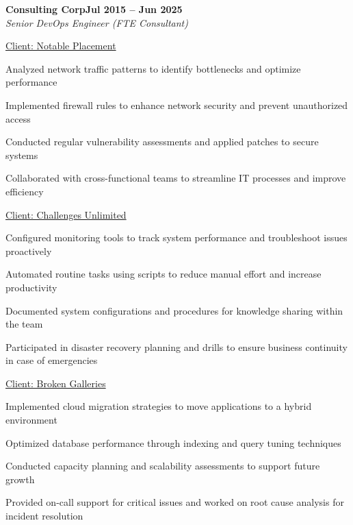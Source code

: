 \documentclass[letterpaper,10pt]{article}
\newcommand{\heading}[2]{
  \hspace{10pt}#1\hfill#2\\
}
\newcommand{\headingBf}[2]{
  \heading{\textbf{#1}}{\textbf{#2}}
}
\newcommand{\headingIt}[2]{
  \heading{\textit{#1}}{\textit{#2}}
}
\newenvironment{resume_list}{
  \vspace{-5pt}
  \begin{itemize}[itemsep=0px, parsep=2pt, leftmargin=30pt]
}{
  \end{itemize}
  \vspace{-2pt}
}
\newcommand{\itemTitle}[1]{
  \item[] \underline{#1}\vspace{5pt}
}
\begin{document}
  \headingBf{Consulting Corp}{Jul 2015 -- Jun 2025}
  \headingIt{Senior DevOps Engineer (FTE Consultant)}{}
  \begin{resume_list}
    \itemTitle{Client: Notable Placement}
    \item Analyzed network traffic patterns to identify bottlenecks and optimize performance
    \item Implemented firewall rules to enhance network security and prevent unauthorized access
    \item Conducted regular vulnerability assessments and applied patches to secure systems
    \item Collaborated with cross-functional teams to streamline IT processes and improve efficiency
    \vspace{3pt}
    \itemTitle{Client: Challenges Unlimited}
    \item Configured monitoring tools to track system performance and troubleshoot issues proactively
    \item Automated routine tasks using scripts to reduce manual effort and increase productivity
    \item Documented system configurations and procedures for knowledge sharing within the team
    \item Participated in disaster recovery planning and drills to ensure business continuity in case of emergencies
    \vspace{3pt}
    \itemTitle{Client: Broken Galleries}
    \item Implemented cloud migration strategies to move applications to a hybrid environment
    \item Optimized database performance through indexing and query tuning techniques
    \item Conducted capacity planning and scalability assessments to support future growth
    \item Provided on-call support for critical issues and worked on root cause analysis for incident resolution
  \end{resume_list}
\end{document}
